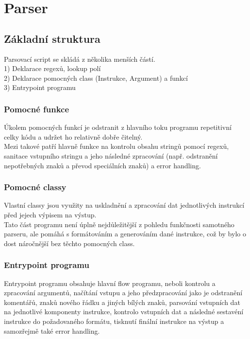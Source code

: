 \section{Parser}


\subsection{Základní struktura}

Parsovací script se skládá z několika menších částí. \\
1) Deklarace regexů, lookup polí \\
2) Deklarace pomocných class (Instrukce, Argument) a funkcí \\
3) Entrypoint programu


\subsubsection{Pomocné funkce}

Úkolem pomocných funkcí je odstranit z hlavního toku programu repetitivní celky kódu a udržet ho relativně dobře čitelný.\\
Mezi takové patří hlavně funkce na kontrolu obsahu stringů pomocí regexů, sanitace vstupního stringu a jeho následné zpracování (např. odstranění nepotřebných znaků a převod speciálních znaků) a error handling.


\subsubsection{Pomocné classy}

Vlastní classy jsou využity na uskladnění a zpracování dat jednotlivých instrukcí před jejech výpisem na výstup. \\
Tato část programu není úplně nejdůležitější z pohledu funkčnosti samotného parseru, ale pomáhá s formátováním a generováním dané instrukce, což by bylo o dost náročnější bez těchto pomocných class.


\subsubsection{Entrypoint programu}

Entrypoint programu obsahuje hlavní flow programu, neboli kontrolu a zpracování argumentů, načítání vstupu a jeho předzpracování jako je odstranění komentářů, znaků nového řádku a jiných bílých znaků, parsování vstupních dat na jednotlivé komponenty instrukce, kontrolo vstupních dat a následné sestavéní instrukce do požadovaného formátu, tisknutí finální instrukce na výstup a samozřejmě také error handling.


